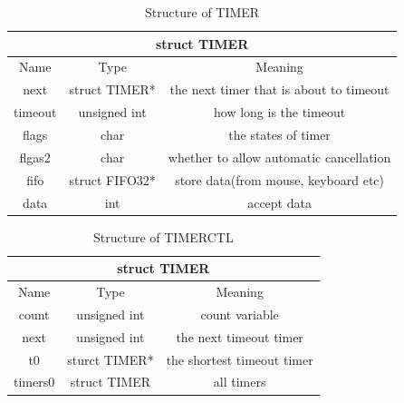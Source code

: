 \documentclass{swfcthesis}
\begin{document}
\begin{table}[!htbp]
  \centering
  \begin{tabular}{|c|c|c|}
    \hline
    \multicolumn{3}{|c|}{struct TIMER} \\
    \hline
    Name & Type & Meaning \\
    \hline
    next & struct TIMER* & the next timer that is about to timeout \\
    \hline
    timeout & unsigned int & how long is the timeout \\
    \hline
    flags & char & the states of timer \\
    \hline
    flgas2 & char & whether to allow automatic cancellation \\
    \hline
    fifo & struct FIFO32* & store data(from mouse, keyboard etc) \\
    \hline
    data & int & accept data \\
    \hline
  \end{tabular}
  \caption{Structure of TIMER}
  \label{tab:TIMER}
\end{table}

\begin{table}[!htbp]
  \centering
  \begin{tabular}{|c|c|c|}
    \hline
    \multicolumn{3}{|c|}{struct TIMER} \\
    \hline
    Name & Type & Meaning \\
    \hline
    count & unsigned int & count variable \\
    \hline
    next & unsigned int & the next timeout timer \\
    \hline
    t0 & sturct TIMER* & the shortest timeout timer \\
    \hline
    timers0 & struct TIMER & all timers \\
    \hline
  \end{tabular}
  \caption{Structure of TIMERCTL}
  \label{tab:TIMERCTL}
\end{table}
\end{document}
